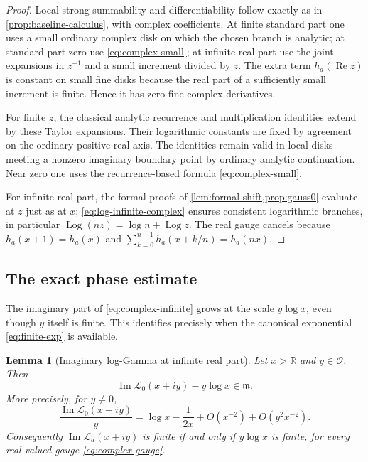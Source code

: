 \documentclass[11pt,letterpaper]{article}
\numberwithin{equation}{section}
\theoremstyle{plain}
\newtheorem{lemma}[lemma]{Lemma}
\theoremstyle{definition}
\theoremstyle{remark}
\newcommand{\R}{\mathbb R}
\newcommand{\Ocal}{\mathcal O}
\newcommand{\mi}{\mathfrak m}
\newcommand{\Log}{\operatorname{Log}}
\newcommand{\Imn}{\operatorname{Im}}
\newcommand{\Ren}{\operatorname{Re}}
\newcommand{\Lt}{\mathcal L}
\begin{document}
\begin{proof}
Local strong summability and differentiability follow exactly as in
\cref{prop:baseline-calculus}, with complex coefficients. At finite
standard part one uses a small ordinary complex disk on which the chosen
branch is analytic; at standard part zero use \eqref{eq:complex-small};
at infinite real part use the joint expansions in $z^{-1}$ and a small
increment divided by $z$. The extra term $h_a(\Ren z)$ is constant on
small fine disks because the real part of a sufficiently small increment
is finite. Hence it has zero fine complex derivatives.

For finite $z$, the classical analytic recurrence and multiplication
identities extend by these Taylor expansions. Their logarithmic constants
are fixed by agreement on the ordinary positive real axis. The identities
remain valid in local disks meeting a nonzero imaginary boundary point by
ordinary analytic continuation. Near zero one uses the recurrence-based
formula \eqref{eq:complex-small}.

For infinite real part, the formal proofs of
\cref{lem:formal-shift,prop:gauss0} evaluate at $z$ just as at $x$;
\eqref{eq:log-infinite-complex} ensures consistent logarithmic branches,
in particular $\Log(nz)=\log n+\Log z$. The real gauge cancels because
$h_a(x+1)=h_a(x)$ and
$\sum_{k=0}^{n-1}h_a(x+k/n)=h_a(nx)$.
\end{proof}

\subsection{The exact phase estimate}
The imaginary part of \eqref{eq:complex-infinite} grows at the scale
$y\log x$, even though $y$ itself is finite. This identifies precisely when
the canonical exponential \eqref{eq:finite-exp} is available.

\begin{lemma}[Imaginary log-Gamma at infinite real part]\label{lem:phase}
Let $x>\R$ and $y\in\Ocal$. Then
\begin{equation}\label{eq:phase-estimate}
 \Imn\Lt_0(x+iy)-y\log x\in\mi.
\end{equation}
More precisely, for $y\ne0$,
\begin{equation}\label{eq:phase-quotient}
 \frac{\Imn\Lt_0(x+iy)}y
 =\log x-\frac1{2x}+O(x^{-2})+O(y^2x^{-2}).
\end{equation}
Consequently $\Imn\Lt_a(x+iy)$ is finite if and only if $y\log x$ is
finite, for every real-valued gauge \eqref{eq:complex-gauge}.
\end{lemma}
\end{document}
